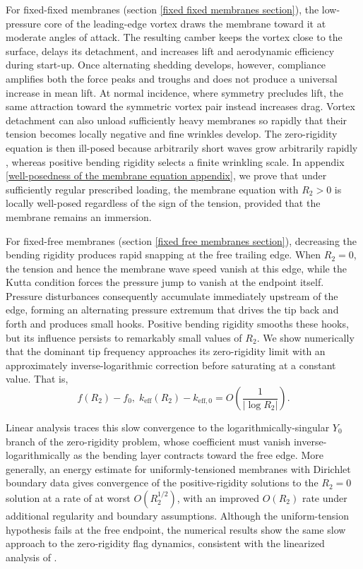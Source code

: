 \documentclass{article}[12pt]
\theoremstyle{Theorem}
\begin{document}
For fixed-fixed membranes (section \ref{fixed fixed membranes section}), the low-pressure core of the leading-edge vortex draws the membrane toward it at moderate angles of attack. The resulting camber keeps the vortex close to the surface, delays its detachment, and increases lift and aerodynamic efficiency during start-up. Once alternating shedding develops, however, compliance amplifies both the force peaks and troughs and does not produce a universal increase in mean lift. At normal incidence, where symmetry precludes lift, the same attraction toward the symmetric vortex pair instead increases drag. Vortex detachment can also unload sufficiently heavy membranes so rapidly that their tension becomes locally negative and fine wrinkles develop. The zero-rigidity equation is then ill-posed because arbitrarily short waves grow arbitrarily rapidly \cite{triantafyllou1994dynamic}, whereas positive bending rigidity selects a finite wrinkling scale. In appendix \ref{well-posedness of the membrane equation appendix}, we prove that under sufficiently regular prescribed loading, the membrane equation with $R_2>0$ is locally well-posed regardless of the sign of the tension, provided that the membrane remains an immersion.
\newline

For fixed-free membranes (section \ref{fixed free membranes section}), decreasing the bending rigidity produces rapid snapping at the free trailing edge. When $R_2=0$, the tension and hence the membrane wave speed vanish at this edge, while the Kutta condition forces the pressure jump to vanish at the endpoint itself. Pressure disturbances consequently accumulate immediately upstream of the edge, forming an alternating pressure extremum that drives the tip back and forth and produces small hooks. Positive bending rigidity smooths these hooks, but its influence persists to remarkably small values of \(R_2\). We show numerically that the dominant tip frequency approaches its zero-rigidity limit with an approximately inverse-logarithmic correction before saturating at a constant value. That is, 
$$
    f(R_2)-f_0,
    \;
    k_{\mathrm{eff}}(R_2)-k_{\mathrm{eff},0}
    =
    O\left(\frac{1}{|\log R_2|}\right).
$$

Linear analysis traces this slow convergence to the logarithmically-singular \(Y_0\) branch of the zero-rigidity problem, whose coefficient must vanish inverse-logarithmically as the bending layer contracts toward the free edge. More generally, an energy estimate for uniformly-tensioned membranes with Dirichlet boundary data gives convergence of the positive-rigidity solutions to the \(R_2=0\) solution at a rate of at worst \(O(R_2^{1/2})\), with an improved \(O(R_2)\) rate under additional regularity and boundary assumptions. Although the uniform-tension hypothesis fails at the free endpoint, the numerical results show the same slow approach to the zero-rigidity flag dynamics, consistent with the linearized analysis of \cite{manela2017hanging}.
\newline
\end{document}
